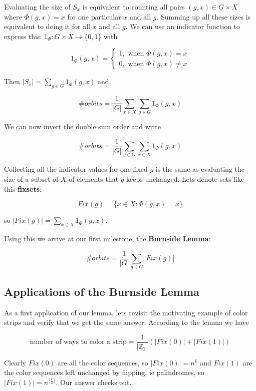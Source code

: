 Evaluating the size of $S_x$ is equivalent to counting all pairs $(g,x) \in G \times X$ where $\Phi(g, x) = x$ for one particular $x$ and all $g$. Summing up all these sizes is equivalent to doing it for all $x$ and all $g$. We can use an indicator function to express this: $1_\Phi: G \times X \mapsto \{0,1\}$ with

$$
1_\Phi(g, x) = 
\begin{cases}
1, \text{ when } \Phi(g, x) = x\\
0, \text{ when } \Phi(g, x) \neq x
\end{cases}
$$

Then $|S_x| = \sum_{g \in G} 1_\Phi (g, x)$ and 

$$
\#orbits = \frac{1}{|G|} \sum_{x \in X} \sum_{g \in G} 1_\Phi (g, x)
$$

We can now invert the double sum order and write

$$
\#orbits = \frac{1}{|G|} \sum_{g \in G} \sum_{x \in X} 1_\Phi (g, x)
$$

Collecting all the indicator values for one fixed $g$ is the same as evaluating the size of a subset of $X$ of elements that $g$ keeps unchanged. Lets denote sets like this \textbf{fixsets}:

$$
Fix(g) = \{x \in X:  \Phi(g, x) = x\}
$$

so $|Fix(g)| = \sum_{x \in X} 1_\Phi (g, x)$.

Using this we arrive at our first milestone, the \textbf{Burnside Lemma}:

$$
\#orbits = \frac{1}{|G|} \sum_{g \in G} |Fix(g)|
$$

\subsection{Applications of the Burnside Lemma}

As a first application of our lemma, lets revisit the motivating example of color strips and verify that we get the same answer. According to the lemma we have

$$
\text{number of ways to color a strip} = \frac{1}{|\mathbb{Z}_2|} (|Fix(0)| + |Fix(1)|)
$$

Clearly $Fix(0)$ are all the color sequences, so $|Fix(0)| = n^k$ and $Fix(1)$ are the color sequences left unchanged by flipping, ie palindromes, so $|Fix(1)| = n^{\lceil \frac{k}{2} \rceil}$. Our answer checks out.


